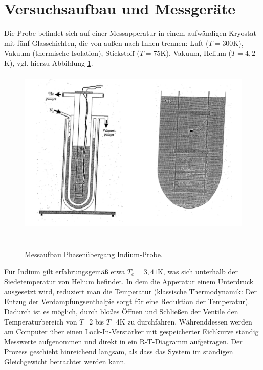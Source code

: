 \section{Versuchsaufbau und Messgeräte}
Die Probe befindet sich auf einer Messapperatur in einem aufwändigen Kryostat mit fünf Glasschichten, die von außen nach Innen trennen: Luft ($T=300$K), Vakuum (thermische Isolation), Stickstoff ($T=75$K), Vakuum, Helium ($T=4,2$K), vgl. hierzu Abbildung \ref{aufbau}.

\begin{figure}[h!]
	\centering
	\includegraphics[height=8cm]{Aufbau.png}	
	~ %
	\caption{Messaufbau Phasenübergang Indium-Probe. \cite{Anleitung}}
	\label{aufbau}
\end{figure}

Für Indium gilt erfahrungsgemäß etwa $T_c=3,41$K, was sich unterhalb der Siedetemperatur von Helium befindet. In dem die Apperatur einem Unterdruck ausgesetzt wird, reduziert man die Temperatur (klassische Thermodynamik: Der Entzug der Verdampfungsenthalpie sorgt für eine Reduktion der Temperatur). Dadurch ist es möglich, durch bloßes Öffnen und Schließen der Ventile den Temperaturbereich von $T$=2 bis $T$=4K zu durchfahren. Währenddessen werden am Computer über einen Lock-In-Verstärker mit gespeicherter Eichkurve ständig Messwerte aufgenommen und direkt in ein R-T-Diagramm aufgetragen. Der Prozess geschieht hinreichend langsam, als dass das System im ständigen Gleichgewicht betrachtet werden kann.